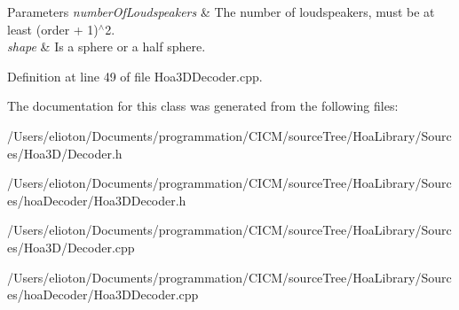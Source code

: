 \begin{DoxyParams}{Parameters}
{\em number\-Of\-Loudspeakers} & The number of loudspeakers, must be at least (order + 1)$^\wedge$2. \\
\hline
{\em shape} & Is a sphere or a half sphere. \\
\hline
\end{DoxyParams}


Definition at line 49 of file Hoa3\-D\-Decoder.\-cpp.



The documentation for this class was generated from the following files\-:\begin{DoxyCompactItemize}
\item 
/\-Users/elioton/\-Documents/programmation/\-C\-I\-C\-M/source\-Tree/\-Hoa\-Library/\-Sources/\-Hoa3\-D/Decoder.\-h\item 
/\-Users/elioton/\-Documents/programmation/\-C\-I\-C\-M/source\-Tree/\-Hoa\-Library/\-Sources/hoa\-Decoder/Hoa3\-D\-Decoder.\-h\item 
/\-Users/elioton/\-Documents/programmation/\-C\-I\-C\-M/source\-Tree/\-Hoa\-Library/\-Sources/\-Hoa3\-D/Decoder.\-cpp\item 
/\-Users/elioton/\-Documents/programmation/\-C\-I\-C\-M/source\-Tree/\-Hoa\-Library/\-Sources/hoa\-Decoder/Hoa3\-D\-Decoder.\-cpp\end{DoxyCompactItemize}
